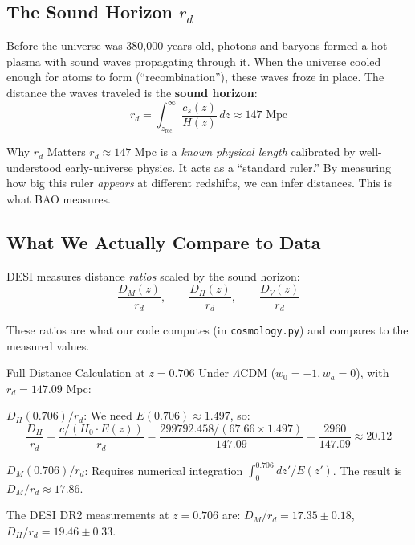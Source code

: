 \documentclass[11pt,a4paper]{article}
\newcommand{\LCDM}{$\Lambda$CDM}
\begin{document}
\subsection{The Sound Horizon $r_d$}

Before the universe was 380,000 years old, photons and baryons formed a hot plasma with sound waves propagating through it. When the universe cooled enough for atoms to form (``recombination''), these waves froze in place. The distance the waves traveled is the \textbf{sound horizon}:
\begin{equation}
r_d = \int_{z_{\text{rec}}}^{\infty} \frac{c_s(z)}{H(z)} \, dz \approx 147 \text{ Mpc}
\end{equation}

\begin{conceptbox}{Why $r_d$ Matters}
$r_d \approx 147$ Mpc is a \textit{known physical length} calibrated by well-understood early-universe physics. It acts as a ``standard ruler.'' By measuring how big this ruler \textit{appears} at different redshifts, we can infer distances. This is what BAO measures.
\end{conceptbox}

\subsection{What We Actually Compare to Data}

DESI measures distance \textit{ratios} scaled by the sound horizon:
\begin{equation}
\frac{D_M(z)}{r_d}, \qquad \frac{D_H(z)}{r_d}, \qquad \frac{D_V(z)}{r_d}
\end{equation}

These ratios are what our code computes (in \texttt{cosmology.py}) and compares to the measured values.

\begin{examplebox}{Full Distance Calculation at $z = 0.706$}
Under \LCDM{} ($w_0 = -1, w_a = 0$), with $r_d = 147.09$ Mpc:

$D_H(0.706)/r_d$: We need $E(0.706) \approx 1.497$, so:
$$\frac{D_H}{r_d} = \frac{c / (H_0 \cdot E(z))}{r_d} = \frac{299792.458 / (67.66 \times 1.497)}{147.09} = \frac{2960}{147.09} \approx 20.12$$

$D_M(0.706)/r_d$: Requires numerical integration $\int_0^{0.706} dz'/E(z')$. The result is $D_M/r_d \approx 17.86$.

The DESI DR2 measurements at $z = 0.706$ are: $D_M/r_d = 17.35 \pm 0.18$, $D_H/r_d = 19.46 \pm 0.33$.
\end{examplebox}
\end{document}
